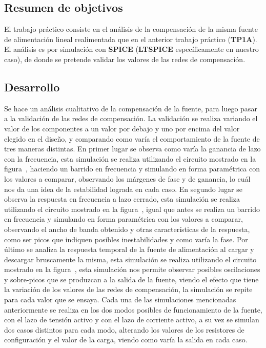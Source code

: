 
\subsection{Resumen de objetivos}


\normalfont

El trabajo práctico consiste en el análisis de la compensación de la misma fuente de alimentación lineal realimentada que en el anterior trabajo práctico (\textbf{TP1A}). El análisis es por simulación con \textbf{SPICE} (\textbf{LTSPICE} específicamente en nuestro caso), de donde se pretende validar los valores de las redes de compensación.


\subsection{Desarrollo}

Se hace un análisis cualitativo de la compensación de la fuente, para luego pasar a la validación de las redes de compensación. La validación se realiza variando el valor de los componentes a un valor por debajo y uno por encima del valor elegido en el diseño, y comparando como varía el comportamiento de la fuente de tres maneras distintas. En primer lugar se observa como varía la ganancia de lazo con la frecuencia, esta simulación se realiza utilizando el circuito mostrado en la figura~, haciendo un barrido en frecuencia y simulando en forma paramétrica con los valores a comparar, observando los márgenes de fase y de ganancia, lo cuál nos da una idea de la estabilidad lograda en cada caso. En segundo lugar se observa la respuesta en frecuencia a lazo cerrado, esta simulación se realiza utilizando el circuito mostrado en la figura~, igual que antes se realiza un barrido en frecuencia y simulando en forma paramétrica con los valores a comparar, observando el ancho de banda obtenido y otras características de la respuesta, como ser picos que indiquen posibles inestabilidades y como varía la fase. Por último se analiza la respuesta temporal de la fuente de alimentación al cargar y descargar bruscamente la misma, esta simulación se realiza utilizando el circuito mostrado en la figura~, esta simulación nos permite observar posibles oscilaciones y sobre-picos que se produzcan a la salida de la fuente, viendo el efecto que tiene la variación de los valores de las redes de compensación, la simulación se repite para cada valor que se ensaya. Cada una de las simulaciones mencionadas anteriormente se realiza en los dos modos posibles de funcionamiento de la fuente, con el lazo de tensión activo y con el lazo de corriente activo, a su vez se simulan dos casos distintos para cada modo, alterando los valores de los resistores de configuración y el valor de la carga, viendo como varía la salida en cada caso.


